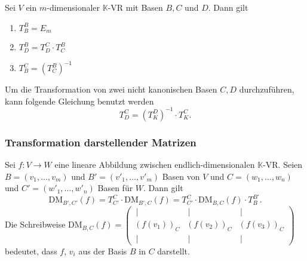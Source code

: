 \documentclass[a4paper,12pt]{article}
\numberwithin{equation}{section}
\begin{document}
Sei $V$ ein $m$-dimensionaler $\mathbb{K}$-VR mit Basen $B,C$ und $D$. Dann gilt
\begin{enumerate}[label=(\alph*)]
        \item $T^B_B=E_m$ 
        \item $T^B_D=T^C_D\cdot T^B_C$ 
        \item $T^C_B=\left(T^B_C\right)^{-1}$
\end{enumerate}
Um die Transformation von zwei nicht kanonischen Basen $C,D$ durchzuführen, kann folgende Gleichung benutzt werden
\[ 
        T^C_D=\left(T^D_K\right)^{-1}\cdot T^C_K
.\] 

\subsubsection{Transformation darstellender Matrizen}
Sei $f:V\rightarrow W$ eine lineare Abbildung zwischen endlich-dimensionalen $\mathbb{K}$-VR. Seien $B=\left(v_1,\hdots ,v_m\right)$ und $B'=\left(v'_1,\hdots ,v'_m\right)$ Basen von $V$ und $C=\left(w_1,\hdots ,w_n\right)$ und $C'=\left(w'_1,\hdots ,w'_n\right)$ Basen für $W$. Dann gilt
\[ 
        \text{DM}_{B',C'}\left(f\right)=T^C_{C'}\cdot \text{DM}_{B',C}\left(f\right)=T^C_{C'}\cdot \text{DM}_{B,C}\left(f\right)\cdot T^{B'}_B
.\] 
Die Schreibweise $\text{DM}_{B,C}\left(f\right)=\left(\begin{matrix} %
                \,|\, &\,|\, &\,|\, \\
                \left(f\left(v_1\right)\right)_C&\left(f\left(v_2\right)\right)_C&\left(f\left(v_3\right)\right)_C\\
                \,|\, &\,|\, &\,|\, 
\end{matrix}\right)$ bedeutet, dass $f$, $v_i$ aus der Basis $B$ in $C$ darstellt.
\end{document}
